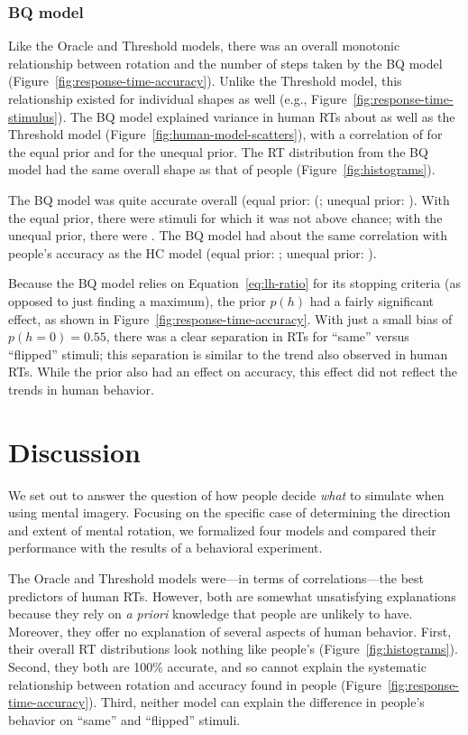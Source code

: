 \documentclass[10pt,letterpaper]{article}
\newcommand{\Oc}[0]{Oracle}
\newcommand{\Th}[0]{Threshold}
\newcommand{\Hc}[0]{HC}
\newcommand{\Bq}[0]{BQ}
\begin{document}
\subsubsection{\Bq{} model}

Like the \Oc{} and \Th{} models, there was an overall monotonic
relationship between rotation and the number of steps taken by the
\Bq{} model (Figure~\ref{fig:response-time-accuracy}). Unlike the
\Th{} model, this relationship existed for individual shapes as well
(e.g., Figure~\ref{fig:response-time-stimulus}).  The \Bq{} model
explained variance in human RTs about as well as the \Th{} model
(Figure~\ref{fig:human-model-scatters}), with a correlation of
\BqTimeCorr{} for the equal prior and \BqpTimeCorr{} for the unequal
prior. The RT distribution from the \Bq{} model had the same overall
shape as that of people (Figure~\ref{fig:histograms}).

The \Bq{} model was quite accurate overall (equal prior:
(\BqAccuracy{}; unequal prior: \BqpAccuracy{}). With the equal prior,
there were \BqNumChance{} stimuli for which it was not above chance;
with the unequal prior, there were \BqpNumChance{}. The \Bq{} model
had about the same correlation with people's accuracy as the \Hc{}
model (equal prior: \BqAccuracyCorr{}; unequal prior:
\BqpAccuracyCorr{}).

Because the \Bq{} model relies on Equation~\ref{eq:lh-ratio} for its
stopping criteria (as opposed to just finding a maximum), the prior
$p(h)$ had a fairly significant effect, as shown in
Figure~\ref{fig:response-time-accuracy}. With just a small bias of
$p(h=0)=0.55$, there was a clear separation in RTs for ``same'' versus
``flipped'' stimuli; this separation is similar to the trend also
observed in human RTs. While the prior also had an effect on accuracy,
this effect did not reflect the trends in human behavior.

\section{Discussion}

We set out to answer the question of how people decide \textit{what}
to simulate when using mental imagery. Focusing on the specific case
of determining the direction and extent of mental rotation, we
formalized four models and compared their performance with the results
of a behavioral experiment.

The \Oc{} and \Th{} models were---in terms of correlations---the best
predictors of human RTs. However, both are somewhat unsatisfying
explanations because they rely on \textit{a priori} knowledge that
people are unlikely to have. Moreover, they offer no explanation of
several aspects of human behavior. First, their overall RT
distributions look nothing like people's
(Figure~\ref{fig:histograms}).  Second, they both are 100\% accurate,
and so cannot explain the systematic relationship between rotation and
accuracy found in people
(Figure~\ref{fig:response-time-accuracy}). Third, neither model can
explain the difference in people's behavior on ``same'' and
``flipped'' stimuli.
\end{document}
